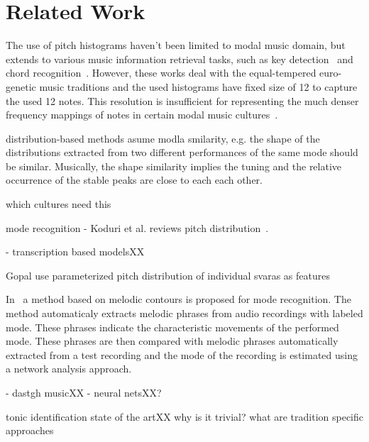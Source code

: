 \documentclass{sig-alternate}
\begin{document}
\section{Related Work}\label{sec:stateoftheart}


The use of pitch histograms haven't been limited to modal music domain, but extends to various music information retrieval tasks, such as key detection~\cite{key_detection} and chord recognition~\cite{emilia}. However, these works deal with the equal-tempered euro-genetic music traditions and the used histograms have fixed size of 12 to capture the used 12 notes. This resolution is insufficient for representing the much denser frequency mappings of notes in certain modal music cultures~\cite{chordia, bozkurt_makam, bozkurt_tonic}. 

distribution-based methods asume modla smilarity, e.g. the shape of the distributions extracted from two different performances of the same mode should be similar. Musically, the shape similarity implies the tuning and the relative occurrence of the stable peaks are close to each each other.

which cultures need this

mode recognition
- Koduri et al. reviews pitch distribution~\cite{koduri2012ragaReview}.

- transcription based modelsXX

Gopal use parameterized pitch distribution of individual svaras as features~\cite{koduri2014intonation}

In~\cite{gulati_network} a method based on melodic contours is proposed for mode recognition. The method automaticaly extracts melodic phrases from audio recordings with labeled mode. These phrases indicate the characteristic movements of the performed mode. These phrases are then compared with melodic phrases automatically extracted from a test recording and the mode of the recording is estimated using a network analysis approach.


- dastgh musicXX
- neural netsXX?

tonic identification state of the artXX why is it trivial? what are tradition specific approaches 
\end{document}
